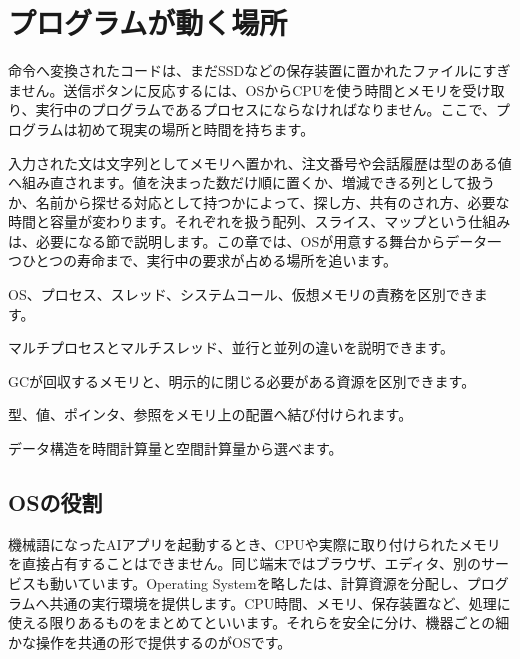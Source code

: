 \chapter{プログラムが動く場所}
\label{chap:runtime-data}

\begin{chapterabstract}
命令へ変換されたコードは、まだSSDなどの保存装置に置かれたファイルにすぎません。送信ボタンに反応するには、OSからCPUを使う時間とメモリを受け取り、実行中のプログラムであるプロセスにならなければなりません。ここで、プログラムは初めて現実の場所と時間を持ちます。

入力された文は文字列としてメモリへ置かれ、注文番号や会話履歴は型のある値へ組み直されます。値を決まった数だけ順に置くか、増減できる列として扱うか、名前から探せる対応として持つかによって、探し方、共有のされ方、必要な時間と容量が変わります。それぞれを扱う配列、スライス、マップという仕組みは、必要になる節で説明します。この章では、OSが用意する舞台からデータ一つひとつの寿命まで、実行中の要求が占める場所を追います。
\end{chapterabstract}

\begin{learninggoals}
  \item OS、プロセス、スレッド、システムコール、仮想メモリの責務を区別できます。
  \item マルチプロセスとマルチスレッド、並行と並列の違いを説明できます。
  \item GCが回収するメモリと、明示的に閉じる必要がある資源を区別できます。
  \item 型、値、ポインタ、参照をメモリ上の配置へ結び付けられます。
  \item データ構造を時間計算量と空間計算量から選べます。
\end{learninggoals}



\section{OSの役割}
\label{sec:03-runtime-data-01}

機械語になったAIアプリを起動するとき、CPUや実際に取り付けられたメモリを直接占有することはできません。同じ端末ではブラウザ、エディタ、別のサービスも動いています。Operating Systemを略したは、計算資源を分配し、プログラムへ共通の実行環境を提供します。CPU時間、メモリ、保存装置など、処理に使える限りあるものをまとめてといいます。それらを安全に分け、機器ごとの細かな操作を共通の形で提供するのがOSです。

